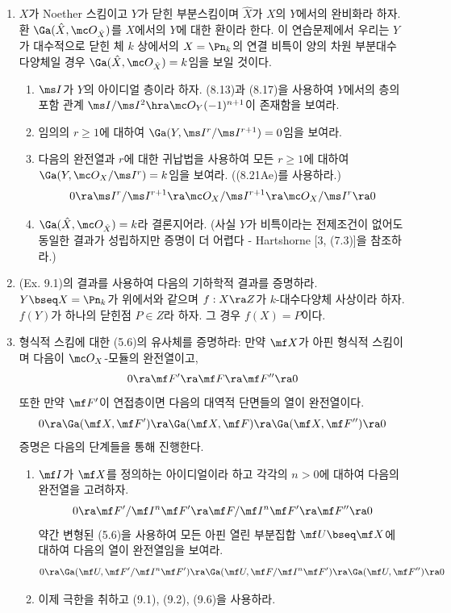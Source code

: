 	\begin{enumerate}[label=\tb{9.\arabic*.},itemindent=0mm,itemsep=2mm]
	\item $X$가 Noether 스킴이고 $Y$가 닫힌 부분스킴이며 $\hat X$가 $X$의 $Y$에서의 완비화라 하자.
	환 $\Ga(\hat X,\mc O_{\hat X})$를 $X$에서의 $Y$에 대한 환이라 한다.
	이 연습문제에서 우리는 $Y$가 대수적으로 닫힌 체 $k$ 상에서의 $X=\Pn_k$의
	연결 비특이 양의 차원 부분대수다양체일 경우 $\Ga(\hat X,\mc O_{\hat X})=k$임을 보일 것이다.
	\begin{enumerate}[label=(\alph*)]
	\item $\ms I$가 $Y$의 아이디얼 층이라 하자.
	(8.13)과 (8.17)을 사용하여 $Y$에서의 층의 포함 관계 $\ms I/\ms I^2\hra\mc O_Y(-1)^{n+1}$이 존재함을 보여라.
	\item 임의의 $r\ge 1$에 대하여 $\Ga(Y,\ms I^r/\ms I^{r+1})=0$임을 보여라.
	\item 다음의 완전열과 $r$에 대한 귀납법을 사용하여 모든 $r\ge 1$에 대하여 $\Ga(Y,\mc O_X/\ms I^r)=k$임을 보여라. ((8.21Ae)를 사용하라.)
	$$0\ra\ms I^r/\ms I^{r+1}\ra\mc O_X/\ms I^{r+1}\ra\mc O_X/\ms I^r\ra 0$$
	\item $\Ga(\hat X,\mc O_{\hat X})=k$라 결론지어라.
	(사실 $Y$가 비특이라는 전제조건이 없어도 동일한 결과가 성립하지만 증명이 더 어렵다 - Hartshorne [3, (7.3)]을 참조하라.)
	\end{enumerate}
	\item (Ex. 9.1)의 결과를 사용하여 다음의 기하학적 결과를 증명하라.
	$Y\bseq X=\Pn_k$가 위에서와 같으며 $f:X\ra Z$가 $k$-대수다양체 사상이라 하자.
	$f(Y)$가 하나의 닫힌점 $P\in Z$라 하자. 그 경우 $f(X)=P$이다.
	\item 형식적 스킴에 대한 (5.6)의 유사체를 증명하라: 만약 $\mf X$가 아핀 형식적 스킴이며 다음이 $\mc O_X$-모듈의 완전열이고,
	$$0\ra\mf F'\ra\mf F\ra\mf F''\ra 0$$
	또한 만약 $\mf F'$이 연접층이면 다음의 대역적 단면들의 열이 완전열이다.
	$$0\ra\Ga(\mf X,\mf F')\ra\Ga(\mf X,\mf F)\ra\Ga(\mf X,\mf F'')\ra 0$$
	증명은 다음의 단계들을 통해 진행한다.
	\begin{enumerate}[label=(\alph*)]
	\item $\mf I$가 $\mf X$를 정의하는 아이디얼이라 하고 각각의 $n>0$에 대하여 다음의 완전열을 고려하자.
	$$0\ra\mf F'/\mf I^n\mf F'\ra\mf F/\mf I^n\mf F'\ra\mf F''\ra 0$$
	약간 변형된 (5.6)을 사용하여 모든 아핀 열린 부분집합 $\mf U\bseq\mf X$에 대하여 다음의 열이 완전열임을 보여라.
	$$0\ra\Ga(\mf U,\mf F'/\mf I^n\mf F')\ra\Ga(\mf U,\mf F/\mf I^n\mf F')\ra\Ga(\mf U,\mf F'')\ra 0$$
	\item 이제 극한을 취하고 (9.1), (9.2), (9.6)을 사용하라.

\end{enumerate}
\end{enumerate}
